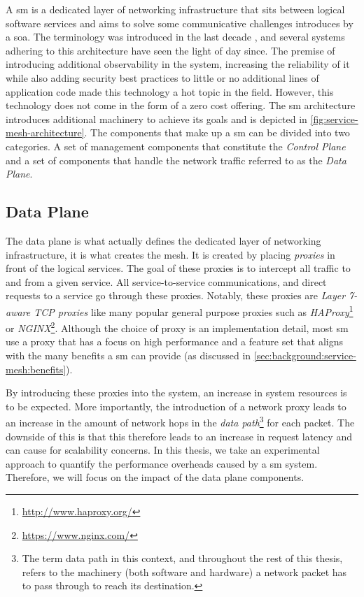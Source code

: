 A \gls{sm} is a dedicated layer of networking infrastructure that sits between logical software services and aims to solve some communicative challenges introduces by a \gls{soa}. The terminology was introduced in the last decade \cite{service-mesh-manifesto}, and several systems adhering to this architecture have seen the light of day since. The premise of introducing additional observability in the system, increasing the reliability of it while also adding security best practices to little or no additional lines of application code made this technology a hot topic in the field. However, this technology does not come in the form of a zero cost offering. The \gls{sm} architecture introduces additional machinery to achieve its goals and is depicted in \cref{fig:service-mesh-architecture}. The components that make up a \gls{sm} can be divided into two  categories. A set of management components that constitute the \textit{Control Plane} and a set of components that handle the network traffic referred to as the \textit{Data Plane}.

\subsection{Data Plane}
\label{sec:background:service-mesh:data-plane}

The data plane is what actually defines the dedicated layer of networking infrastructure, it is what creates the mesh. It is created by placing \textit{proxies} in front of the logical services. The goal of these proxies is to intercept all traffic to and from a given service. All service-to-service communications, and direct requests to a service go through these proxies. Notably, these proxies are \textit{Layer 7-aware TCP proxies} like many popular general purpose proxies such as \textit{HAProxy}\footnote{\url{http://www.haproxy.org/}} or \textit{NGINX}\footnote{\url{https://www.nginx.com/}}. Although the choice of proxy is an implementation detail, most \gls{sm} use a proxy that has a focus on high performance and a feature set that aligns with the many benefits a \gls{sm} can provide (as discussed in \cref{sec:background:service-mesh:benefits}).

By introducing these proxies into the system, an increase in system resources is to be expected. More importantly, the introduction of a network proxy leads to an increase in the amount of network hops in the \textit{data path}\footnote{The term data path in this context, and throughout the rest of this thesis, refers to the machinery (both software and hardware) a network packet has to pass through to reach its destination.} for each packet. The downside of this is that this therefore leads to an increase in request latency and can cause for scalability concerns. In this thesis, we take an experimental approach to quantify the performance overheads caused by a \gls{sm} system. Therefore, we will focus on the impact of the data plane components.


